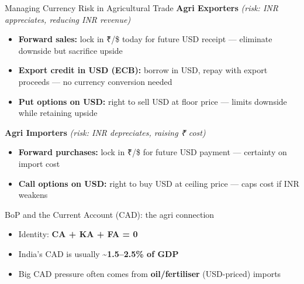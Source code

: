 \documentclass[
  ignorenonframetext,
  aspectratio=169,
]{beamer}
\makeatletter
\providecommand{\tightlist}{%
  \setlength{\itemsep}{0pt}\setlength{\parskip}{0pt}}
\let\quarto@originallabel\label
\DeclareRobustCommand*{\label}[1]{\quarto@originallabel{#1}}
\makeatother
\begin{document}
\begin{frame}{Managing Currency Risk in Agricultural Trade}
\label{managing-currency-risk-in-agricultural-trade}
\textbf{Agri Exporters} \emph{(risk: INR appreciates, reducing INR
revenue)}

\begin{itemize}
\tightlist
\item
  \textbf{Forward sales:} lock in ₹/\$ today for future USD receipt ---
  eliminate downside but sacrifice upside
\item
  \textbf{Export credit in USD (ECB):} borrow in USD, repay with export
  proceeds --- no currency conversion needed
\item
  \textbf{Put options on USD:} right to sell USD at floor price ---
  limits downside while retaining upside
\end{itemize}

\textbf{Agri Importers} \emph{(risk: INR depreciates, raising ₹ cost)}

\begin{itemize}
\tightlist
\item
  \textbf{Forward purchases:} lock in ₹/\$ for future USD payment ---
  certainty on import cost
\item
  \textbf{Call options on USD:} right to buy USD at ceiling price ---
  caps cost if INR weakens
\end{itemize}

\end{frame}

\begin{frame}{BoP and the Current Account (CAD): the agri connection}
\label{bop-and-the-current-account-cad-the-agri-connection}
\begin{itemize}
\tightlist
\item
  Identity: \textbf{CA + KA + FA = 0}
\item
  India's CAD is usually \textbf{\textasciitilde1.5--2.5\% of GDP}
\item
  Big CAD pressure often comes from \textbf{oil/fertiliser} (USD-priced)
  imports
\end{itemize}
\end{frame}
\end{document}
